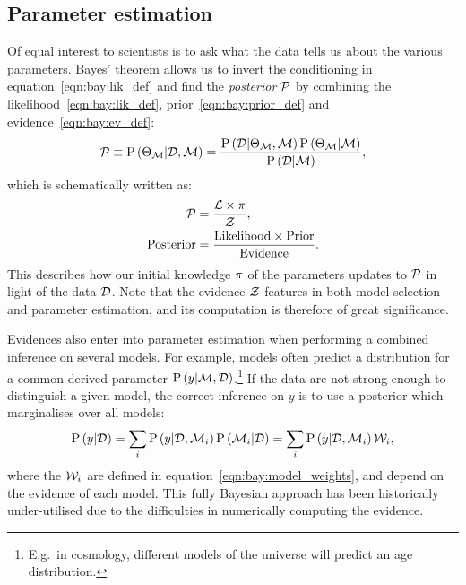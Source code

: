\subsection{Parameter estimation}
Of equal interest to scientists is to ask what the data tells us about the various parameters.  
Bayes' theorem allows us to invert the conditioning in equation~\eqref{eqn:bay:lik_def} and find the {\em posterior\/} \(\mathcal{P}\) by combining the likelihood~\eqref{eqn:bay:lik_def}, prior~\eqref{eqn:bay:prior_def} and evidence~\eqref{eqn:bay:ev_def}:
%
\begin{equation}
  \mathcal{P}\equiv
  \mathrm{P}\left(\Theta_{\mathcal{M}}\middle|\mathcal{D},\mathcal{M}\right) = \frac{\mathrm{P}\left(\mathcal{D}\middle|\Theta_{\mathcal{M}},\mathcal{M}\right) \mathrm{P}\left(\Theta_{\mathcal{M}}\middle|\mathcal{M}\right)}{\mathrm{P}\left(\mathcal{D}\middle|\mathcal{M}\right)},
  \label{eqn:bay:bayes_theorem}
\end{equation}
%
which is schematically written as:
\begin{align}
  \mathcal{P} &= \frac{\mathcal{L} \times \pi }{\mathcal{Z} },
  \label{eqn:bay:bayes_theorem_abbrv}\\
  \mathrm{Posterior} &= \frac{\mathrm{Likelihood} \times \mathrm{Prior} }{\mathrm{Evidence} }.
\end{align}
This describes how our initial knowledge \(\pi\) of the parameters updates to \(\mathcal{P}\) in light of the data \(\mathcal{D}\). Note that the evidence \(\mathcal{Z}\) features in both model selection and parameter estimation, and its computation is therefore of great significance.

Evidences also enter into parameter estimation when performing a combined inference on several models.
For example, models often predict a distribution for a common derived parameter \(\mathrm{P}\left(y\middle|\mathcal{M},\mathcal{D}\right)\).\footnote{E.g.\ in cosmology, different models of the universe will predict an age distribution.} If the data are not strong enough to distinguish a given model, the correct inference on \(y\) is to use a posterior which marginalises over all models:
\begin{equation}
  \mathrm{P}\left(y\middle|\mathcal{D}\right) 
  = \sum_i\mathrm{P}\left(y\middle|\mathcal{D},\mathcal{M}_i\right)\mathrm{P}\left(\mathcal{M}_i\middle|\mathcal{D}\right)
  = \sum_i\mathrm{P}\left(y\middle|\mathcal{D},\mathcal{M}_i\right)\mathcal{W}_i,
\end{equation}
where the \(\mathcal{W}_i\) are defined in equation~\eqref{eqn:bay:model_weights}, and depend on the evidence of each model.
This fully Bayesian approach has been historically under-utilised due to the difficulties in numerically computing the evidence.





